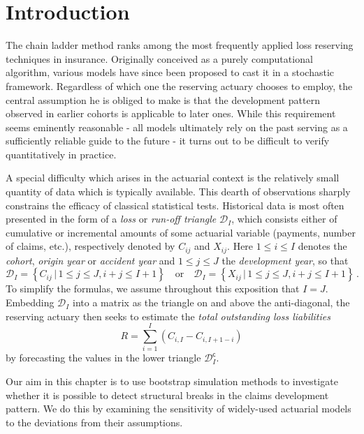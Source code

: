 \documentclass[a4paper]{book}
\theoremstyle{plain}
\begin{document}
\section{Introduction}

The chain ladder method ranks among the most frequently applied loss reserving techniques in insurance. Originally conceived as a purely computational algorithm, various models have since been proposed to cast it in a stochastic framework. Regardless of which one the reserving actuary chooses to employ, the central assumption he is obliged to make is that the development pattern observed in earlier cohorts is applicable to later ones. While this requirement seems eminently reasonable - all models ultimately rely on the past serving as a sufficiently reliable guide to the future - it turns out to be difficult to verify quantitatively in practice. 

A special difficulty which arises in the actuarial context is the relatively small quantity of data which is typically available. This dearth of observations sharply constrains the efficacy of classical statistical tests. Historical data is most often presented in the form of a \emph{loss} or \emph{run-off triangle} $\mathcal{D}_I$, which consists either of cumulative or incremental amounts of some actuarial variable (payments, number of claims, etc.), respectively denoted by $C_{ij}$ and $X_{ij}$. Here $1 \leq i \leq I$ denotes the \emph{cohort}, \emph{origin year} or \emph {accident year} and $1 \leq j \leq J$ the \emph{development year}, so that
\begin{equation}
    \mathcal{D}_I = \left\lbrace C_{ij} \, \vert \, 1 \leq j \leq J, i + j \leq I + 1 \right \rbrace 
    \quad \text{or} \quad 
    \mathcal{D}_I = \left\lbrace X_{ij} \, \vert \, 1 \leq j \leq J, i + j \leq I + 1 \right \rbrace \,.
\end{equation}
To simplify the formulas, we assume throughout this exposition that $I = J$. Embedding $\mathcal{D}_I$ into a matrix as the triangle on and above the anti-diagonal, the reserving actuary then seeks to estimate the \emph{total outstanding loss liabilities}
\begin{equation}
    R = \sum_{i = 1}^I (C_{i, I} - C_{i, I + 1- i})
\end{equation}
by forecasting the values in the lower triangle $\mathcal{D}^{\mathsf{c}}_I$. 

Our aim in this chapter is to use bootstrap simulation methods to investigate whether it is possible to detect structural breaks in the claims development pattern. We do this by examining the sensitivity of widely-used actuarial models to the deviations from their assumptions.  
\end{document}
